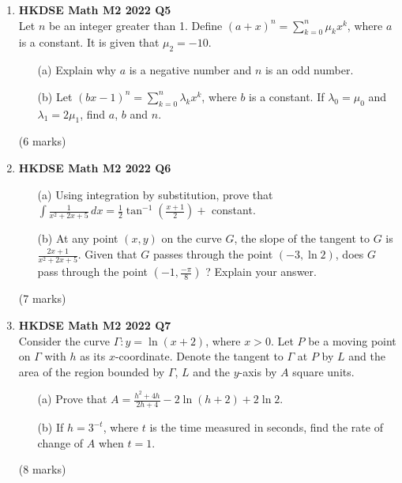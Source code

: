 \documentclass[12pt]{article}
\begin{document}
\begin{enumerate}
	\item \textbf{HKDSE Math M2 2022 Q5}\\
	Let $n$ be an integer greater than 1. Define $\displaystyle (a+x)^n  = \sum_{k = 0}^{n} \mu_k x^k$, where $a$ is a constant. It is given that $\mu_2 = -10$.
	\begin{enumerate}
		\item [(a)] Explain why $a$ is a negative number and $n$ is an odd number. 
		\item [(b)] Let $\displaystyle (bx-1)^n  = \sum_{k = 0}^{n} \lambda_k x^k$, where $b$ is a constant. If $\lambda_0 = \mu_0$ and $\lambda_1 = 2\mu_1$, find $a$, $b$ and $n$.
	\end{enumerate}
	(6 marks)

	\item \textbf{HKDSE Math M2 2022 Q6}
	\begin{enumerate}
		\item [(a)]Using integration by substitution, prove that $\displaystyle \int \frac{1}{x^2+2x+5}\,dx = \frac{1}{2} \tan^{-1} \left(\frac{x+1}{2}\right) +$ constant.
		\item [(b)]At any point $(x,y)$ on the curve $G$, the slope of the tangent to $G$ is $\displaystyle \frac{2x+1}{x^2+2x+5}$. Given that $G$ passes through the point $(-3, \ln{2})$, does $G$ pass through the point $\displaystyle \left(-1, \frac{-\pi}{8}\right)$ ? Explain your answer.
	\end{enumerate}
	(7 marks)

	\item \textbf{HKDSE Math M2 2022 Q7}\\
	Consider the curve $\Gamma : y = \ln{(x+2)}$, where $x > 0$. Let $P$ be a moving point on $\Gamma$ with $h$ as its $x$-coordinate. Denote the tangent to $\Gamma$ at $P$ by $L$ and the area of the region bounded by $\Gamma$, $L$ and the $y$-axis by $A$ square units.
	\begin{enumerate}
		\item [(a)]Prove that $\displaystyle A = \frac{h^2+4h}{2h+4} - 2\ln{(h+2)} + 2\ln{2}$.
		\item [(b)]If $h = 3^{-t}$, where $t$ is the time measured in seconds, find the rate of change of $A$ when $t = 1$.
	\end{enumerate}
	(8 marks)


\end{enumerate}
\end{document}
